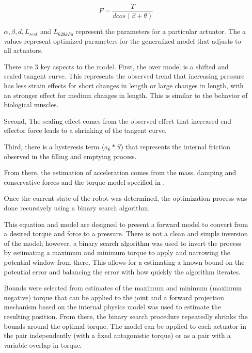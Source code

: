 \begin{equation}
F = \dfrac{T}{d cos(\beta + \theta)}
\end{equation}

$\alpha, \beta, d, L_{rest}$ and $L_{620 kPa}$ represent the parameters for a 
particular actuator. The $a$ values represent optimized parameters
for the generalized model that adjusts to all actuators.

There are 3 key aspects to the model. First, the over model is a shifted and 
scaled tangent curve. This represents the observed trend that increasing 
pressure has less strain effects for short changes in length or large changes in 
length, with an stronger effect for medium changes in length. This is similar to 
the behavior of biological muscles.

Second, The scaling effect comes from the observed
effect that increased end effector force leads to a shrinking of the tangent 
curve.

Third, there is a hysteresis term ($a_{6} * S$) that represents the internal
friction observed in the filling and emptying process.

From there, the estimation of acceleration comes from the mass, 
damping and conservative forces and the torque model specified in
.


Once the current state of the robot was determined, the optimization process was 
done recursively using a binary search algorithm. 

This equation and model are designed to present a forward model to convert from 
a desired torque and force to a pressure. There is not a clean and simple 
inversion of the model; however, a binary search algorithm was used to invert 
the process by estimating a maximum and minimum torque to apply and narrowing the
potential window from there. This allows for a estimating a known bound on the 
potential error and balancing the error with how quickly the algorithm iterates.


Bounds were selected from estimates
of the maximum and minimum (maximum negative) torque that can be applied to the
joint and a forward projection mechanism based on the internal physics model was
used to estimate the resulting position. From there, the binary search procedure
repeatedly shrinks the bounds around the optimal torque. The model can be 
applied to each actuator in the pair independently (with a fixed antagonistic 
torque) or as a pair with a variable overlap in torque. 

